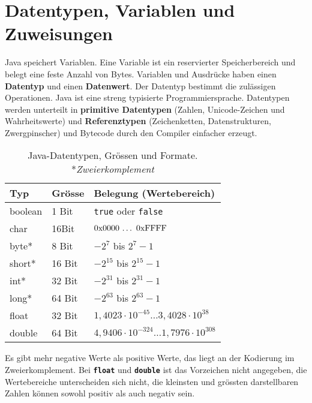 \section{Datentypen, Variablen und Zuweisungen}
Java speichert Variablen. Eine Variable ist ein reservierter Speicherbereich und belegt eine feste Anzahl von Bytes. Variablen und Ausdrücke haben einen \textbf{Datentyp} und einen \textbf{Datenwert}. Der Datentyp bestimmt die zulässigen Operationen. Java ist eine streng typisierte Programmiersprache. Datentypen werden unterteilt in \textbf{primitive Datentypen} (Zahlen, Unicode-Zeichen und Wahrheitswerte) und \textbf{Referenztypen} (Zeichenketten, Datenstrukturen, Zwergpinscher) und Bytecode durch den Compiler einfacher erzeugt.
\begin{table}[H]
\centering
\begin{tabular}{lll}
\hline
Typ&Grösse&Belegung (Wertebereich)\\\hline
boolean&1 Bit&\texttt{true} oder \texttt{false}\\
char& 16Bit&$\text{0x0000 \dotso 0xFFFF}$\\\hline
byte*&8 Bit&$-2^7$ bis $2^7-1$\\
short*&16 Bit&$-2^{15}$ bis $2^{15}-1$\\
int*&32 Bit&$-2^{31}$ bis $2^{31}-1$ \\
long*&64 Bit&$-2^{63}$ bis $2^{63}-1$\\\hline
float&32 Bit&$1,4023\cdot 10^{-45} \dotso 3,4028\cdot10^{38}$\\
double&64 Bit&$4,9406\cdot 10^{-324} \dotso 1,7976\cdot 10^{308}$\\\hline
\end{tabular}
\caption{Java-Datentypen, Grössen und Formate. *\textit{Zweierkomplement}}
\end{table}
\noindent Es gibt mehr negative Werte als positive Werte, das liegt an der Kodierung im Zweierkomplement. Bei \textbf{\texttt{float}} und \textbf{\texttt{double}} ist das Vorzeichen nicht angegeben, die Wertebereiche unterscheiden sich nicht, die kleinsten und grössten darstellbaren Zahlen können sowohl positiv als auch negativ sein.
